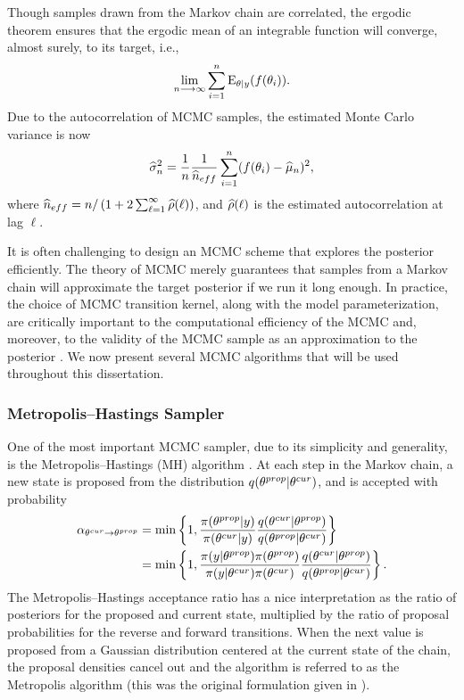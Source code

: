 Though samples drawn from the Markov chain are correlated, the ergodic theorem ensures that the ergodic mean of an integrable function will converge, almost surely, to its target, i.e.,
$$\lim\limits_{n\longrightarrow\infty}\sum_{i=1}^n\mathrm{E}_{\theta|y}(f(\theta_i)).$$
Due to the autocorrelation of MCMC samples, the estimated Monte Carlo variance is now 
$$\widehat{\sigma}_n^2 = \frac{1}{n}\frac{1}{\widehat{n}_{eff}}\sum_{i=1}^n(f(\theta_i) - \widehat{\mu}_n)^2,$$
where $ \widehat{n}_{eff} = n / \left (1 + 2\sum_{\ell=1}^{\infty}\widehat{\rho}(\ell)\right ) $, and $ \widehat{\rho}(\ell) $ is the estimated autocorrelation at lag $ \ell $. 

It is often challenging to design an MCMC scheme that explores the posterior efficiently. The theory of MCMC merely guarantees that samples from a Markov chain will approximate the target posterior if we run it long enough. In practice, the choice of MCMC transition kernel, along with the model parameterization, are critically important to the computational efficiency of the MCMC and, moreover, to the validity of the MCMC sample as an approximation to the posterior \cite{betancourt2017conceptual}. We now present several MCMC algorithms that will be used throughout this dissertation. 

\subsubsection{Metropolis--Hastings Sampler}
\label{subsubsec:metropolis_hastings}

One of the most important MCMC sampler, due to its simplicity and generality, is the Metropolis--Hastings (MH) algorithm \cite{hastings1970monte,metropolis1953equation}. At each step in the Markov chain, a new state is proposed from the distribution $ q(\theta^{prop}|\theta^{cur}) $, and is accepted with probability
\begin{align}
\label{eqn:metropolis_hastings_1}
\alpha_{\theta^{cur}\rightarrow\theta^{prop}} &= \min\left \lbrace 1, \frac{\pi(\theta^{prop}|y)}{\pi(\theta^{cur}|y)}\frac{q(\theta^{cur}|\theta^{prop})}{q(\theta^{prop}|\theta^{cur})}\right \rbrace \\
\label{eqn:metropolis_hastings_2}
&= \min\left \lbrace 1, \frac{\pi(y|\theta^{prop})\pi(\theta^{prop})}{\pi(y|\theta^{cur})\pi(\theta^{cur})}\frac{q(\theta^{cur}|\theta^{prop})}{q(\theta^{prop}|\theta^{cur})}\right \rbrace.
\end{align}
The Metropolis--Hastings acceptance ratio has a nice interpretation as the ratio of posteriors for the proposed and current state, multiplied by the ratio of proposal probabilities for the reverse and forward transitions. When the next value is proposed from a Gaussian distribution centered at the current state of the chain, the proposal densities cancel out and the algorithm is referred to as the Metropolis algorithm (this was the original formulation given in \cite{metropolis1953equation}). 

